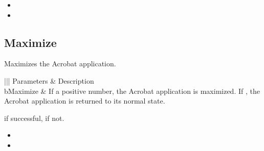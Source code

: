\documentclass[letterpaper,12pt,english,openany,oneside]{sphinxmanual}
\begin{document}
\label{\detokenize{IAC_API_OLE_Objects:related-methods-12}}
\begin{itemize}
\item {} 
 

\item {} 
 

\end{itemize}




\subsection{Maximize}
\label{\detokenize{IAC_API_OLE_Objects:maximize}}
Maximizes the Acrobat application.


\begin{sphinxVerbatim}[commandchars=\\\{\}]
  
\end{sphinxVerbatim}
\label{\detokenize{IAC_API_OLE_Objects:parameters-6}}


\begin{savenotes}\sphinxattablestart
\centering
{}\label{\detokenize{IAC_API_OLE_Objects:section-8}}\nobreak
\begin{tabular}[t]{|||}
\hline
\sphinxstyletheadfamily 
Parameters
&\sphinxstyletheadfamily 
Description
\\
\hline
bMaximize
&
If a positive number, the Acrobat application is maximized. If , the Acrobat application is returned to its normal state.
\\
\hline
\end{tabular}
\par
\sphinxattableend\end{savenotes}


 if successful,  if not.

\label{\detokenize{IAC_API_OLE_Objects:related-methods-13}}
\begin{itemize}
\item {} 
 

\item {} 
 

\end{itemize}
\end{document}

